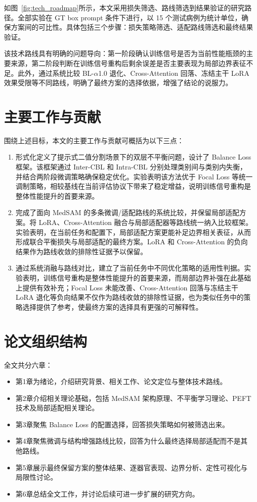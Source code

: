 如图~\ref{fig:tech_roadmap}所示，本文采用损失筛选、路线筛选到结果验证的研究路径。全部实验在 GT box prompt 条件下进行，以 15 个测试病例为统计单位，确保方案间的可比性。具体包括三个步骤：损失策略筛选、适配路线筛选和最终结果验证。

该技术路线具有明确的问题导向：第一阶段确认训练信号是否为当前性能瓶颈的主要来源，第二阶段判断在训练信号重构后剩余误差是否主要表现为局部边界表征不足。此外，通过系统比较 BL-$\alpha$1.0 退化、Cross-Attention 回落、冻结主干 LoRA 效果受限等不同路线，明确了最终方案的选择依据，增强了结论的说服力。

\section{主要工作与贡献}

围绕上述目标，本文的主要工作与贡献可概括为以下三点：

\begin{enumerate}
  \item 形式化定义了提示式二值分割场景下的双层不平衡问题，设计了 Balance Loss 框架。该框架通过 Inter-CBL 和 Intra-CBL 分别处理类别间与类别内失衡，并结合两阶段微调策略确保稳定优化。实验表明该方法优于 Focal Loss 等统一调制策略，相较基线在当前评估协议下带来了稳定增益，说明训练信号重构是整体性能提升的首要来源。

  \item 完成了面向 MedSAM 的多条微调/适配路线的系统比较，并保留局部适配方案。将 LoRA、Cross-Attention 融合与局部适配器等路线统一纳入比较框架。实验表明，在当前任务和配置下，局部适配方案更能补足边界相关表征，从而形成联合平衡损失与局部适配的最终方案。LoRA 和 Cross-Attention 的负向结果作为路线收敛的排除性证据予以保留。

  \item 通过系统消融与路线对比，建立了当前任务中不同优化策略的适用性判据。实验表明，训练信号重构是整体性能提升的首要来源，而局部边界补强在此基础上提供有效补充；Focal Loss 未能改善、Cross-Attention 回落与冻结主干 LoRA 退化等负向结果不仅作为路线收敛的排除性证据，也为类似任务中的策略选择提供了参考，使最终方案的选择具有更强的可解释性。
\end{enumerate}

\section{论文组织结构}

全文共分六章：

\begin{itemize}
  \item 第1章为绪论，介绍研究背景、相关工作、论文定位与整体技术路线。
  \item 第2章介绍相关理论基础，包括 MedSAM 架构原理、不平衡学习理论、PEFT 技术及局部适配相关理论。
  \item 第3章聚焦 Balance Loss 的配置选择，回答损失策略如何被筛选出来。
  \item 第4章聚焦微调与结构增强路线比较，回答为什么最终选择局部适配而不是其他路线。
  \item 第5章展示最终保留方案的整体结果、逐器官表现、边界分析、定性可视化与局限性讨论。
  \item 第6章总结全文工作，并讨论后续可进一步扩展的研究方向。
\end{itemize}
